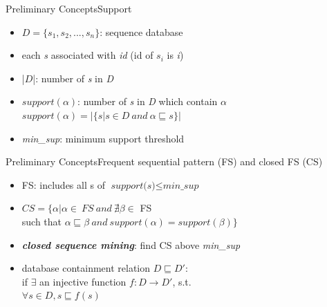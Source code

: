 \documentclass[14pt]{beamer}
\begin{document}
\begin{frame}{Preliminary Concepts}{Support}
\begin{itemize}
\item $\textit{D} = \{ s_1,s_2,...,s_n \}$: sequence database
\item each \textit{s} associated with \textit{id} (id of $s_i$ is \textit{i})
\item |$\textit{D}$|: number of \textit{s} in \textit{D}
\item $support(\alpha)$: number of \textit{s} in \textit{D} which contain $\alpha$\\
$support(\alpha) = |\{ s|s \in D~and~\alpha \sqsubseteq s\}|$
\item \textit{min\_sup}: minimum support threshold
\end{itemize}
\end{frame}

\begin{frame}{Preliminary Concepts}{Frequent sequential pattern (FS) and closed FS (CS)}
\begin{itemize}
\item FS: includes all s of $\textit{support(s)} \leq \textit{min\_sup}$
\item $CS = \{ \alpha|\alpha \in~FS~and~\nexists\beta \in$ FS\\such that $\alpha \sqsubseteq \beta~and~support(\alpha) = support(\beta)\}$
\item {\bf {\it closed sequence mining}}: find CS above {\it min\_sup}
\item database containment relation $D \sqsubseteq D'$:\\if $\exists$ an injective function $f : D \rightarrow D'$, s.t.\\
$\forall s \in D, s \sqsubseteq f(s)$
\end{itemize}
\end{frame}


\end{document}
